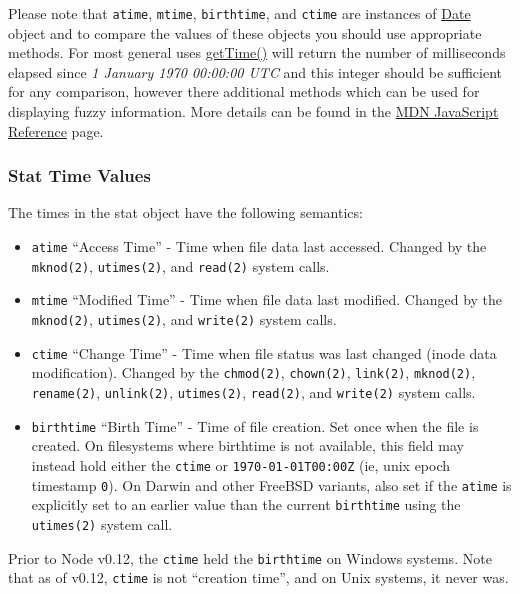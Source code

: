 Please note that \texttt{atime}, \texttt{mtime}, \texttt{birthtime}, and
\texttt{ctime} are instances of
\href{https://developer.mozilla.org/en/JavaScript/Reference/Global\_Objects/Date}{Date}
object and to compare the values of these objects you should use
appropriate methods. For most general uses
\href{https://developer.mozilla.org/en/JavaScript/Reference/Global\_Objects/Date/getTime}{getTime()}
will return the number of milliseconds elapsed since \emph{1 January
1970 00:00:00 UTC} and this integer should be sufficient for any
comparison, however there additional methods which can be used for
displaying fuzzy information. More details can be found in the
\href{https://developer.mozilla.org/en/JavaScript/Reference/Global\_Objects/Date}{MDN
JavaScript Reference} page.

\subsubsection{Stat Time Values}

The times in the stat object have the following semantics:

\begin{itemize}
\item
  \texttt{atime} ``Access Time'' - Time when file data last accessed.
  Changed by the \texttt{mknod(2)}, \texttt{utimes(2)}, and
  \texttt{read(2)} system calls.
\item
  \texttt{mtime} ``Modified Time'' - Time when file data last modified.
  Changed by the \texttt{mknod(2)}, \texttt{utimes(2)}, and
  \texttt{write(2)} system calls.
\item
  \texttt{ctime} ``Change Time'' - Time when file status was last
  changed (inode data modification). Changed by the \texttt{chmod(2)},
  \texttt{chown(2)}, \texttt{link(2)}, \texttt{mknod(2)},
  \texttt{rename(2)}, \texttt{unlink(2)}, \texttt{utimes(2)},
  \texttt{read(2)}, and \texttt{write(2)} system calls.
\item
  \texttt{birthtime} ``Birth Time'' - Time of file creation. Set once
  when the file is created. On filesystems where birthtime is not
  available, this field may instead hold either the \texttt{ctime} or
  \texttt{1970-01-01T00:00Z} (ie, unix epoch timestamp \texttt{0}). On
  Darwin and other FreeBSD variants, also set if the \texttt{atime} is
  explicitly set to an earlier value than the current \texttt{birthtime}
  using the \texttt{utimes(2)} system call.
\end{itemize}

Prior to Node v0.12, the \texttt{ctime} held the \texttt{birthtime} on
Windows systems. Note that as of v0.12, \texttt{ctime} is not ``creation
time'', and on Unix systems, it never was.

